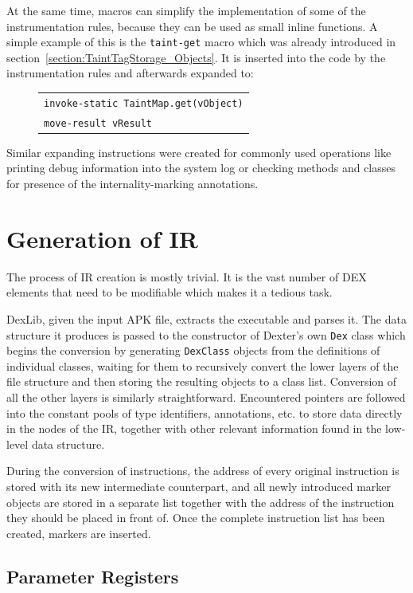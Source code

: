\documentclass[12pt,twoside,notitlepage]{report}
\newcommand{\centerbox}[1] {
	\begin{center}
	\begin{footnotesize}
	\begin{tabular}{l}
		#1
	\end{tabular}
	\end{footnotesize}
	\end{center}
}
\newcommand{\asm}[1] {\texttt{#1}}
\begin{document}
At the same time, macros can simplify the implementation of some of the instrumentation rules, because they can be used as small inline functions. A simple example of this is the \verb$taint-get$ macro which was already introduced in section~\ref{section:TaintTagStorage_Objects}. It is inserted into the code by the instrumentation rules and afterwards expanded to:
	\begin{figure}[H]
		\centerbox{
			\asm{invoke-static TaintMap.get(vObject)} \\
			\asm{move-result vResult}
		}
	\end{figure}
Similar expanding instructions were created for commonly used operations like printing debug information into the system log or checking methods and classes for presence of the internality-marking annotations.

\section{Generation of IR}

The process of IR creation is mostly trivial. It is the vast number of DEX elements that need to be modifiable which makes it a tedious task. 

DexLib, given the input APK file, extracts the executable and parses it. The data structure it produces is passed to the constructor of Dexter's own \verb$Dex$ class which begins the conversion by generating \verb$DexClass$ objects from the definitions of individual classes, waiting for them to recursively convert the lower layers of the file structure and then storing the resulting objects to a class list. Conversion of all the other layers is similarly straightforward. Encountered pointers are followed into the constant pools of type identifiers, annotations, etc. to store data directly in the nodes of the IR, together with other relevant information found in the low-level data structure. 

During the conversion of instructions, the address of every original instruction is stored with its new intermediate counterpart, and all newly introduced marker objects are stored in a separate list together with the address of the instruction they should be placed in front of. Once the complete instruction list has been created, markers are inserted.

\subsection{Parameter Registers}
\label{section:Code_ParamRegMapping}
\end{document}
